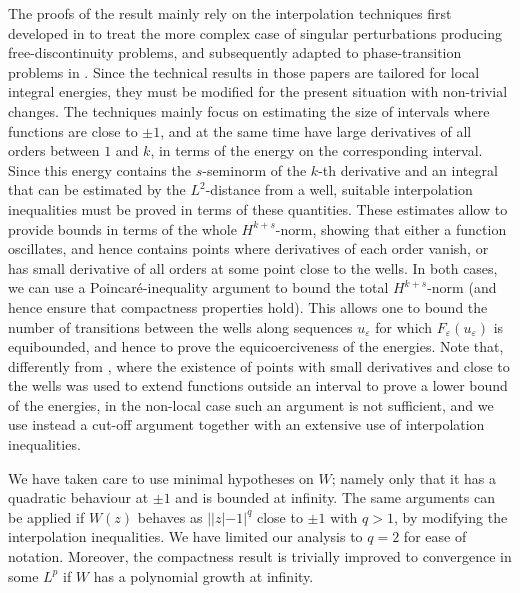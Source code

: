 \documentclass{article}
\newcommand{\e}{\varepsilon}
\begin{document}
\smallskip
The proofs of the result mainly rely on the interpolation techniques first developed in \cite{solci} to treat the more complex case of singular perturbations producing free-discontinuity problems, and subsequently adapted to phase-transition problems in \cite{BDS}. Since the technical results in those papers are tailored for local integral energies, they must be modified for the present situation with non-trivial changes. The techniques mainly focus on estimating the size of intervals where functions are close to $\pm 1$, and at the same time have large derivatives of all orders between $1$ and $k$, in terms of the energy on the corresponding interval. Since this energy contains the $s$-seminorm of the $k$-th derivative and an integral that can be estimated by the $L^2$-distance from a well, suitable interpolation inequalities must be proved in terms of these quantities. These estimates allow to provide bounds in terms of the whole $H^{k+s}$-norm, showing that either a function oscillates, and hence contains points where derivatives of each order vanish, or has small derivative of all orders at some point close to the wells. In both cases, we can use a Poincar\'e-inequality argument to bound the total $H^{k+s}$-norm (and hence ensure that compactness properties hold). This allows one to bound the number of transitions between the wells along sequences $u_\e$ for which  $F_\e(u_\e)$ is equibounded, and hence to prove the equicoerciveness of the energies. Note that, differently from \cite{BDS}, where the existence of points with small derivatives and close to the wells was used to extend functions outside an interval to prove a lower bound of the energies, in the non-local case such an argument is not sufficient, and we use instead a cut-off argument together with an extensive use of interpolation inequalities. 

We have taken care to use minimal hypotheses on $W$; namely only that it has a quadratic behaviour at $\pm1$ and is bounded at infinity. The same arguments can be applied if $W(z)$ behaves as $||z|-1|^q$ close to $\pm1$ with $q>1$, by modifying the interpolation inequalities. We have limited our analysis to $q=2$ for ease of notation. Moreover, the compactness result is trivially improved to convergence in some $L^p$ if $W$ has a polynomial growth at infinity. 
\end{document}
